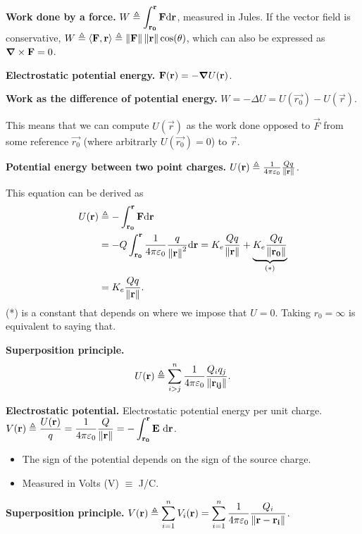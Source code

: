 \documentclass[10pt, a4paper, landscape]{article}
\begin{document}
\begin{multicols*}{3}
\textbf{Work done by a force.} $W\triangleq\displaystyle\int_{\mathbf{r_0}}^{\mathbf{r}}\mathbf{F}\dd\mathbf{r}$, measured in Jules.
If the vector field is conservative, $W\triangleq\langle \mathbf{F}, \mathbf{r} \rangle\triangleq\left\Vert \mathbf{F} \right\Vert\left\Vert \mathbf{r} \right\Vert\cos(\theta)$, which can
also be expressed as $\grad\times\mathbf{F} = 0$.

\textbf{Electrostatic potential energy.} $\mathbf{F}(\mathbf{r}) = -\grad U(\mathbf{r})$.

\textbf{Work as the difference of potential energy.} $W = -\Delta U = U(\vec{r_0}) - U(\vec{r})$.

This means that we can compute $U(\vec{r})$ as the work done opposed to $\vec{F}$ from some reference $\vec{r_0}$ (where
arbitrarly $U(\vec{r_0}) = 0$) to $\vec{r}$.

\textbf{Potential energy between two point charges.} $U(\mathbf{r})\triangleq\frac{1}{4\pi\varepsilon_0}\frac{Qq}{\left\Vert \mathbf{r} \right\Vert}$.

This equation can be derived as
\begin{align*}
    U(\mathbf{r})&\triangleq -\int_{\mathbf{r_0}}^{\mathbf{r}}\mathbf{F}\dd\mathbf{r} \\
              &= -Q\int_{\mathbf{r_0}}^{\mathbf{r}}\frac{1}{4\pi\varepsilon_0}\frac{q}{\left\Vert \mathbf{r} \right\Vert^2}\dd\mathbf{r} = K_e
              \frac{Qq}{\left\Vert \mathbf{r} \right\Vert} + \underbrace{K_e \frac{Qq}{\left\Vert \mathbf{r_0} \right\Vert}}_{(*)} \\
              &= K_e\frac{Qq}{\left\Vert \mathbf{r} \right\Vert}.
\end{align*}
(*) is a constant that depends on where we impose that $U =0$. Taking $r_0 = \infty$ is equivalent to saying that.

\textbf{Superposition principle.} $$U(\mathbf{r})\triangleq\sum_{i > j}^n \frac{1}{4\pi\varepsilon_0}\frac{Q_iq_j}{\left\Vert \mathbf{r_{ij}} \right\Vert}.$$

\textbf{Electrostatic potential.} Electrostatic potential energy per unit charge. $V(\mathbf{r})\triangleq\displaystyle
\frac{U(\mathbf{r})}{q} = \frac{1}{4\pi\varepsilon_0}\frac{Q}{\left\Vert \mathbf{r} \right\Vert} =
-\displaystyle\int_{\mathbf{r_0}}^{\mathbf{r}}\mathbf{E}\ \dd\mathbf{r}$.
\begin{itemize}
    \item The sign of the potential depends on the sign of the source charge.
    \item Measured in Volts (V) $\equiv$ J/C.
\end{itemize}

\textbf{Superposition principle.} $V(\mathbf{r})\triangleq\displaystyle\sum_{i=1}^n V_i(\mathbf{r}) = \displaystyle\sum_{i=1}^n
\frac{1}{4\pi\varepsilon_0}\frac{Q_i}{\left\Vert \mathbf{r} - \mathbf{r_i} \right\Vert}$.


\end{multicols*}
\end{document}
